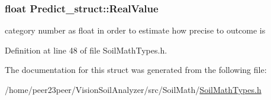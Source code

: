 \hypertarget{struct_predict__struct_a09932ff9ac15e4b182bf6e53232eba0f}{}
\subsubsection[{Real\+Value}]{\setlength{\rightskip}{0pt plus 5cm}float Predict\+\_\+struct\+::\+Real\+Value}\label{struct_predict__struct_a09932ff9ac15e4b182bf6e53232eba0f}
category number as float in order to estimate how precise to outcome is 

Definition at line 48 of file Soil\+Math\+Types.\+h.



The documentation for this struct was generated from the following file\+:\begin{DoxyCompactItemize}
\item 
/home/peer23peer/\+Vision\+Soil\+Analyzer/src/\+Soil\+Math/\hyperlink{_soil_math_types_8h}{Soil\+Math\+Types.\+h}\end{DoxyCompactItemize}
